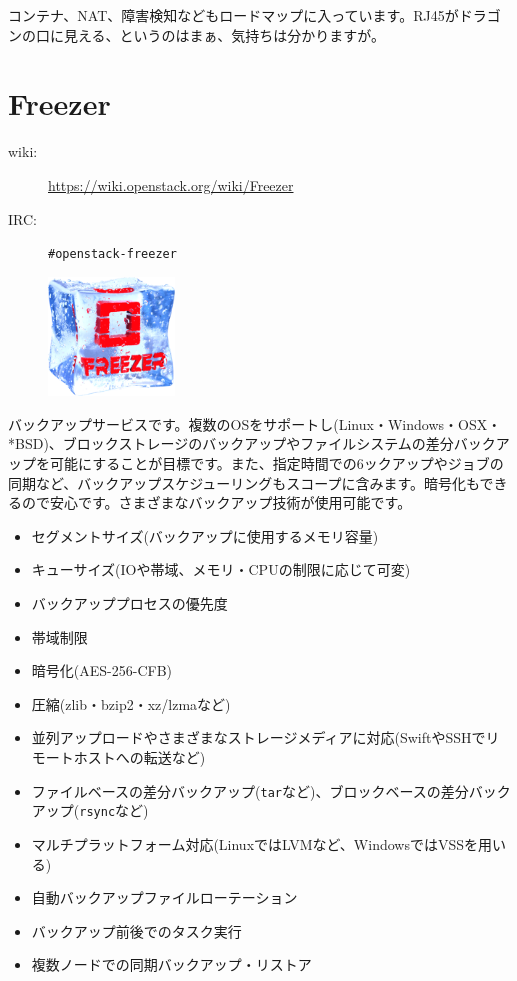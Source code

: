 コンテナ、NAT、障害検知などもロードマップに入っています。RJ45がドラゴンの口に見える、というのはまぁ、気持ちは分かりますが。

\section{Freezer}

\begin{description}
	\item[wiki:] \url{https://wiki.openstack.org/wiki/Freezer}
	\item[IRC:] \verb|#openstack-freezer|
\end{description}

\begin{figure}
	\begin{center}
		\includegraphics[width=0.3\textwidth]{img/freezer_logo.png}
	\end{center}
\end{figure}

バックアップサービスです。複数のOSをサポートし(Linux・Windows・OSX・*BSD)、ブロックストレージのバックアップやファイルシステムの差分バックアップを可能にすることが目標です。また、指定時間での6ックアップやジョブの同期など、バックアップスケジューリングもスコープに含みます。暗号化もできるので安心です。さまざまなバックアップ技術が使用可能です。

\begin{itemize}
	\item セグメントサイズ(バックアップに使用するメモリ容量)
	\item キューサイズ(IOや帯域、メモリ・CPUの制限に応じて可変)
	\item バックアッププロセスの優先度
	\item 帯域制限
	\item 暗号化(AES-256-CFB)
	\item 圧縮(zlib・bzip2・xz/lzmaなど)
	\item 並列アップロードやさまざまなストレージメディアに対応(SwiftやSSHでリモートホストへの転送など)
	\item ファイルベースの差分バックアップ(\verb|tar|など)、ブロックベースの差分バックアップ(\verb|rsync|など)
	\item マルチプラットフォーム対応(LinuxではLVMなど、WindowsではVSSを用いる)
	\item 自動バックアップファイルローテーション
	\item バックアップ前後でのタスク実行
	\item 複数ノードでの同期バックアップ・リストア
\end{itemize}

